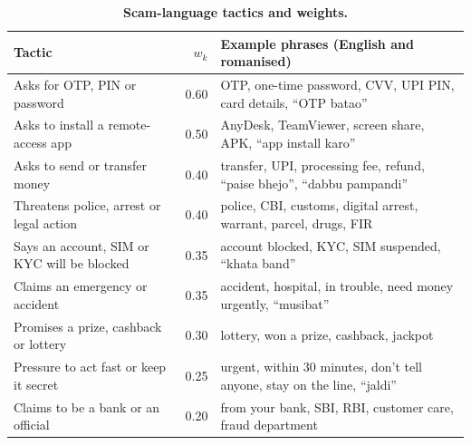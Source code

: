 \documentclass[10pt,a4paper,twocolumn]{article}
\begin{document}
\begin{table}[H]
\centering\small
\caption{\textbf{Scam-language tactics and weights.}}
\label{tab:tactics}
\begin{tabular}{@{}p{}rp{}@{}}
\toprule
\textbf{Tactic} & \textbf{$w_k$} & \textbf{Example phrases (English and romanised)}\\
\midrule
Asks for OTP, PIN or password & 0.60 & OTP, one-time password, CVV, UPI PIN, card details, ``OTP batao''\\
Asks to install a remote-access app & 0.50 & AnyDesk, TeamViewer, screen share, APK, ``app install karo''\\
Asks to send or transfer money & 0.40 & transfer, UPI, processing fee, refund, ``paise bhejo'', ``dabbu pampandi''\\
Threatens police, arrest or legal action & 0.40 & police, CBI, customs, digital arrest, warrant, parcel, drugs, FIR\\
Says an account, SIM or KYC will be blocked & 0.35 & account blocked, KYC, SIM suspended, ``khata band''\\
Claims an emergency or accident & 0.35 & accident, hospital, in trouble, need money urgently, ``musibat''\\
Promises a prize, cashback or lottery & 0.30 & lottery, won a prize, cashback, jackpot\\
Pressure to act fast or keep it secret & 0.25 & urgent, within 30 minutes, don't tell anyone, stay on the line, ``jaldi''\\
Claims to be a bank or an official & 0.20 & from your bank, SBI, RBI, customer care, fraud department\\
\bottomrule
\end{tabular}
\end{table}
\end{document}
